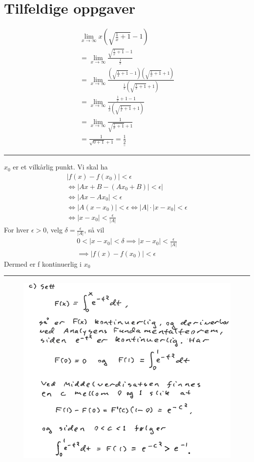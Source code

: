 \documentclass[defaultpackages]{cheatsheet}
\def\doubleunderline#1{\underline{\underline{#1}}}
\begin{document}
	\section{Tilfeldige oppgaver}
	\begin{gather*}
		\lim_{x\to\infty} x\left( \sqrt{\frac{1}{x} + 1} -1 \right)\\
		=\lim_{x\to\infty} \frac{\sqrt{\frac{1}{x} + 1} - 1}{\frac{1}{x}}\\
		=\lim_{x\to\infty} \frac{\left(\sqrt{\frac{1}{x} + 1} - 1\right)\left(\sqrt{\frac{1}{x} + 1} + 1\right)}{\frac{1}{x}\left(\sqrt{\frac{1}{x} + 1} + 1\right)}\\
		=\lim_{x\to\infty} \frac{\frac{1}{x} + 1 - 1}{\frac{1}{x}\left(\sqrt{\frac{1}{x} + 1} + 1\right)}\\
		=\lim_{x\to\infty} \frac{1}{\sqrt{\frac{1}{x} + 1} + 1}\\
		=\frac{1}{\sqrt{0 + 1} + 1}=\doubleunderline{\frac{1}{2}}
	\end{gather*}
	\rule{\columnwidth}{0.5pt}
	$x_0$ er et vilkårlig punkt. Vi skal ha
	\begin{gather*}
		|f(x) - f(x_0)| < \epsilon\\
		\Leftrightarrow |Ax+B - (Ax_0 + B)|<\epsilon|\\
		\Leftrightarrow |Ax - Ax_0|<\epsilon\\
		\Leftrightarrow |A(x-x_0)| < \epsilon
		\Leftrightarrow |A|\cdot|x-x_0| < \epsilon\\
		\Leftrightarrow |x-x_0|<\frac{\epsilon}{|A|}
	\end{gather*}
	For hver $\epsilon>0$, velg $\delta = \frac{\epsilon}{|A|}$, så vil
	\begin{gather*}
		0 < | x - x_0 | < \delta \implies |x-x_0|<\frac{\epsilon}{|A|}\\
		\implies |f(x) - f(x_0)|<\epsilon
	\end{gather*}
	Dermed er f kontinuerlig i $x_0$
	\rule{\columnwidth}{0.5pt}
	\begin{figure}[H]
		\includegraphics[width=\columnwidth]{idk2.png}
	\end{figure}
	
\end{document}

